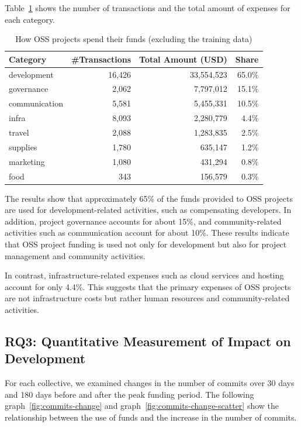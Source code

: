 \documentclass[11pt]{ist-thesis-lt}
\begin{document}
Table~\ref{tab:expense-summary} shows the number of transactions and the total amount of expenses for each category.

\begin{table}[htbp]
\centering
\caption{How OSS projects spend their funds (excluding the training data)}\label{tab:expense-summary}
\begin{tabular}{lrrr}
\toprule
Category & \#Transactions & Total Amount (USD) & Share \\
\midrule
development & 16,426 & 33,554,523 & 65.0\% \\
governance & 2,062 & 7,797,012 & 15.1\% \\
communication & 5,581 & 5,455,331 & 10.5\% \\
infra & 8,093 & 2,280,779 & 4.4\% \\
travel & 2,088 & 1,283,835 & 2.5\% \\
supplies & 1,780 & 635,147 & 1.2\% \\
marketing & 1,080 & 431,294 & 0.8\% \\
food & 343 & 156,579 & 0.3\% \\
\bottomrule
\end{tabular}
\end{table}

The results show that approximately 65\% of the funds provided to OSS projects are used for development-related activities, such as compensating developers.
In addition, project governance accounts for about 15\%, and community-related activities such as communication account for about 10\%.
These results indicate that OSS project funding is used not only for development but also for project management and community activities.

In contrast, infrastructure-related expenses such as cloud services and hosting account for only 4.4\%.
This suggests that the primary expenses of OSS projects are not infrastructure costs but rather human resources and community-related activities.

\subsection{RQ3: Quantitative Measurement of Impact on Development}
For each collective, we examined changes in the number of commits over 30 days and 180 days before and after the peak funding period.
The following graph~\ref{fig:commits-change} and graph~\ref{fig:commits-change-scatter} show the relationship between the use of funds and the increase in the number of commits.
\end{document}
